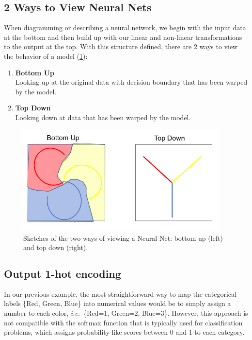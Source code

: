 \subsection{2 Ways to View Neural Nets}
When diagramming or describing a neural network, we begin with the input data at the bottom and then build up with our linear and non-linear transformations to the output at the top. With this structure defined, there are 2 ways to view the behavior of a model (\cref{fig:views}):\\

\begin{enumerate}
    \item \textbf{Bottom Up}\\
    Looking up at the original data with decision boundary that has been warped by the model.
    \item \textbf{Top Down}\\
    Looking down at data that has been warped by the model.
\end{enumerate}

\begin{figure}[ht]
    \centering
    \includegraphics[width=300pt]{labs/02/images/views.png}
    \caption{Sketches of the two ways of viewing a Neural Net: bottom up (left) and top down (right).}
    \label{fig:views}
\end{figure}

\subsection{Output 1-hot encoding} \label{ssc:1hot}
In our previous example, the most straightforward way to map the categorical labels \{Red, Green, Blue\} into numerical values would be to simply assign a number to each color, \emph{i.e.}\ \{Red=1, Green=2, Blue=3\}.
However, this approach is not compatible with the softmax function that is typically used for classification problems, which assigns probability-like scores between 0 and 1 to each category. 

